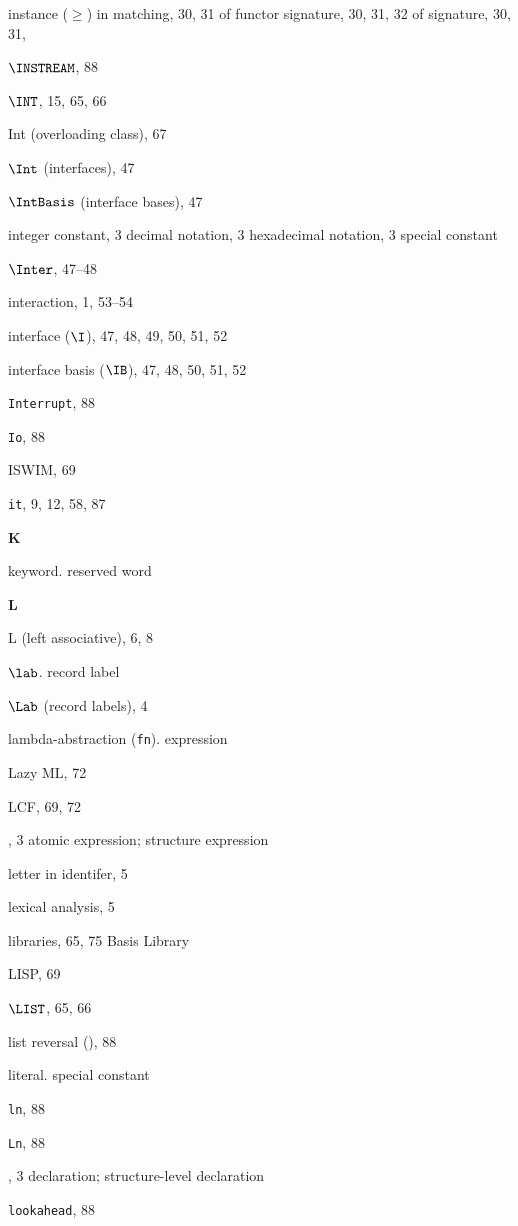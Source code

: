 \begin{theindex}
\item instance ($\geq$) 
\subitem in matching, 30, 31
\subitem of functor signature, 30, 31, 32
\subitem of signature, 30, 31, 
\item $\INSTREAM$, 88
\item $\INT$, 15, 65, 66
\item Int (overloading class), 67
\item $\Int$ (interfaces), 47
\item $\IntBasis$ (interface bases), 47
\item integer constant, 3
\subitem decimal notation, 3
\subitem hexadecimal notation, 3
\subitem \seealso special constant
\item $\Inter$, 47--48
\item interaction, 1, 53--54
\item interface ($\I$), 47, 48, 49, 50, 51, 52
\item interface basis ($\IB$), 47, 48, 50, 51, 52
\item {\tt Interrupt}, 88
\item {\tt Io}, 88
\item ISWIM, 69
\item {\tt it}, 9, 12, 58, 87
\indexspace

\parbox{64mm}{\hfil{\large\bf K}\hfil}

\indexspace
\item keyword. \see reserved word
\indexspace

\parbox{64mm}{\hfil{\large\bf L}\hfil}

\indexspace

\item L (left associative), 6, 8
\item $\lab$. \see record label
\item $\Lab$ (record labels), 4
\item lambda-abstraction ({\tt fn}). \see expression
\item Lazy ML, 72
\item LCF, 69, 72
\item \LET, 3
\subitem \seealso atomic expression; structure expression
\item letter in identifer, 5
\item lexical analysis, 5
\item libraries, 65, 75
\subitem \seealso Basis Library
\item LISP, 69
\item $\LIST$, 65, 66
\item list reversal (), 88
\item literal. \see special constant
\item {\tt ln}, 88
\item {\tt Ln}, 88
\item \LOCAL, 3
\subitem \seealso declaration; structure-level declaration
\item {\tt lookahead}, 88
\indexspace


\end{theindex}

